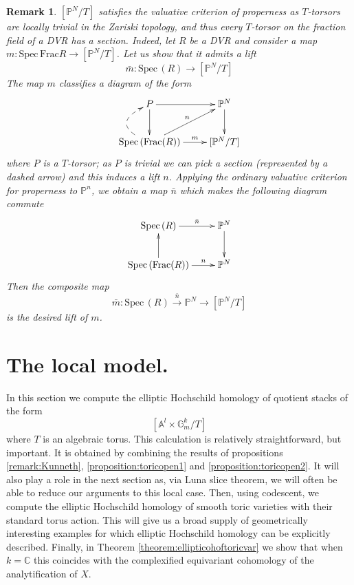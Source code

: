 \documentclass[11pt,letterpaper]{amsart}
\newtheorem{remark}[dummy]{Remark}
\newcommand{\bP}{\mathbb{P}}
\newcommand{\Spec}{\mathrm{S}\mathrm{pec}\,}
\newcommand{\Frac}{\mathrm{Frac}}
\begin{document}
\begin{remark}
\label{valuativeprop}
$[\bP^N/T]$ satisfies the valuative criterion of properness as $T$-torsors are locally trivial in the Zariski topology, and thus every $T$-torsor on the fraction field of a DVR  has a section. Indeed, let $R$ be a DVR and  consider a map $m: \Spec \Frac R \to [\bP^N/T]$. Let us show that it admits a lift 
$$
\bar m: \Spec(R) \to [\bP^N/T]
$$ 
The map $m$ classifies a diagram of the form 
$$
\xymatrix{
P \ar[r] \ar[d] & \bP^N \ar[d] \\
\Spec(\mathrm{Frac}(R)) \ar[r]^-m \ar[ur]^-n \ar@/^2pc/@{-->}[u]  & [\bP^N/T]}
$$
where $P$ is a $T$-torsor; as $P$ is trivial we can pick a section (represented by a dashed arrow) and this induces a lift $n$. Applying the ordinary valuative criterion for properness to $\bP^n$, we obtain a map $\bar n$ which makes the following diagram commute
$$
\xymatrix{
 \Spec(R) \ar[r]^-{\bar{ n}}  & \bP^N \ar[d] \\
\Spec(\mathrm{Frac}(R)) \ar[u] \ar[r]^-n      & \bP^N}
$$
Then the  composite map 
$$
\bar m: \Spec(R) \stackrel{\bar n} \rightarrow \bP^N  \rightarrow [\bP^N/T]
$$
is the desired lift of $m$.  
\end{remark}

\section{The local model.}\label{section:mainthmproof} 
In this section we compute the elliptic Hochschild homology of quotient stacks of the form 
\begin{equation}
\label{model}
 [\mathbb{A}^l \times \mathbb{G}_m^{k}/T]
\end{equation}
where $T$ is an algebraic torus. This calculation is relatively straightforward, but important. It is obtained by combining the results of propositions \ref{remark:Kunneth}, \ref{proposition:toricopen1} and \ref{proposition:toricopen2}. It will also play a role in the next section as, via Luna slice theorem, we will often be  able to reduce our arguments to this local case.
Then, using codescent, we compute the elliptic Hochschild homology of smooth toric varieties with their standard torus action. This will give us a broad supply of geometrically interesting examples for which  elliptic Hochschild homology can be explicitly described. Finally, in Theorem \ref{theorem:ellipticohoftoricvar} we show that when $k=\mathbb{C}$ this coincides with the complexified equivariant cohomology of the analytification of $X$. 
  
\end{document}
